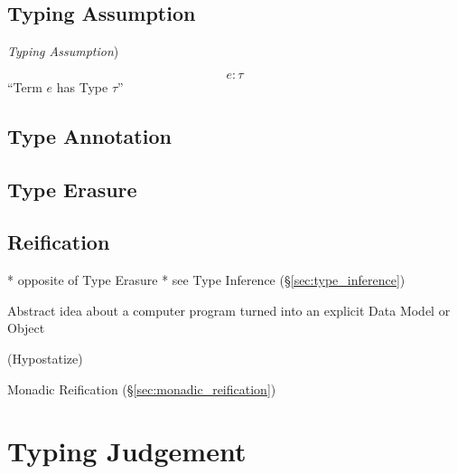 \subsection{Typing Assumption}\label{sec:typing_assumption}

\emph{Typing Assumption})

\[
  e : \tau
\]
``Term $e$ has Type $\tau$''



\subsection{Type Annotation}\label{sec:type_annotation}

\subsection{Type Erasure}\label{sec:type_erasure}

\subsection{Reification}\label{sec:reification}

* opposite of Type Erasure
* see Type Inference (\S\ref{sec:type_inference})

Abstract idea about a computer program turned into an explicit Data
Model or Object

(Hypostatize) %

Monadic Reification (\S\ref{sec:monadic_reification})



\section{Typing Judgement}\label{sec:typing_judgement}

